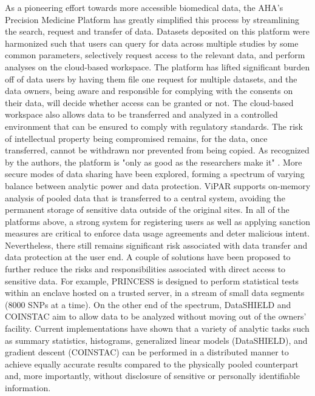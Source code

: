 \documentclass[letter]{bib}
\newcounter{example}[subsection]
\begin{document}
	As a pioneering effort towards more accessible biomedical data, the AHA's Precision Medicine Platform \citep{Kass-Hout:2018:American} has greatly simplified this process by streamlining the search, request and transfer of data. Datasets deposited on this platform were harmonized such that users can query for data across multiple studies by some common parameters, selectively request access to the relevant data, and perform analyses on the cloud-based workspace. The platform has lifted significant burden off of data users by having them file one request for multiple datasets, and the data owners, being aware and responsible for complying with the consents on their data, will decide whether access can be granted or not. The cloud-based workspace also allows data to be transferred and analyzed in a controlled environment that can be ensured to comply with regulatory standards. The risk of intellectual property being compromised remains, for the data, once transferred, cannot be withdrawn nor prevented from being copied. As recognized by the authors, the platform is "only as good as the researchers make it" \citep{Kass-Hout:2018:American}.
	More secure modes of data sharing have been explored, forming a spectrum of varying balance between analytic power and data protection. ViPAR \citep{Carter:2016:ViPAR} supports on-memory analysis of pooled data that is transferred to a central system, avoiding the permanent storage of sensitive data outside of the original sites.  In all of the platforms above, a strong system for registering users as well as applying sanction measures are critical to enforce data usage agreements and deter malicious intent. Nevertheless, there still remains significant risk associated with data transfer and data protection at the user end.
	A couple of solutions have been proposed to further reduce the risks and responsibilities associated with direct access to sensitive data. For example, PRINCESS \citep{Chen:2017:PRINCESS} is designed to perform statistical tests within an enclave hosted on a trusted server, in a stream of small data segments (8000 SNPs at a time). On the other end of the spectrum, DataSHIELD \citep{Gaye:2014:DataSHIELD, Wilson:2017:DataSHIELD} and COINSTAC \citep{Plis:2016:COINSTAC} aim to allow data to be analyzed without moving out of the owners' facility. Current implementations have shown that a variety of analytic tasks such as summary statistics, histograms, generalized linear models (DataSHIELD), and gradient descent (COINSTAC) can be performed in a distributed manner to achieve equally accurate results compared to the physically pooled counterpart and, more importantly, without disclosure of sensitive or personally identifiable information.
	
\end{document}
